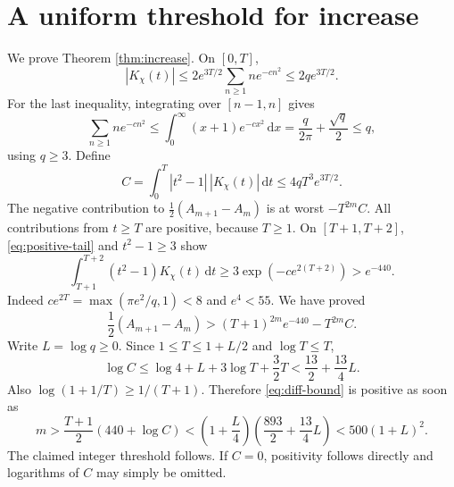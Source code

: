 \documentclass[11pt]{article}
\newcommand{\dd}{\,\mathrm d}
\begin{document}
\section{A uniform threshold for increase}
We prove Theorem \ref{thm:increase}. On $[0,T]$,
\[
 |K_\chi(t)|\le2e^{3T/2}\sum_{n\ge1}n e^{-cn^2}
 \le2qe^{3T/2}.
\]
For the last inequality, integrating over $[n-1,n]$ gives
\[
 \sum_{n\ge1}n e^{-cn^2}
 \le\int_0^\infty(x+1)e^{-cx^2}\dd x
 =\frac q{2\pi}+\frac{\sqrt q}{2}\le q,
\]
using $q\ge3$. Define
\[
 C=\int_0^T|t^2-1|\,|K_\chi(t)|\dd t
 \le4qT^3e^{3T/2}.
\]
The negative contribution to $\frac12(A_{m+1}-A_m)$ is at worst $-T^{2m}C$. All contributions from $t\ge T$ are positive, because $T\ge1$. On $[T+1,T+2]$, \eqref{eq:positive-tail} and $t^2-1\ge3$ show
\[
 \int_{T+1}^{T+2}(t^2-1)K_\chi(t)\dd t
 \ge3\exp(-ce^{2(T+2)})>e^{-440}.
\]
Indeed $ce^{2T}=\max(\pi e^2/q,1)<8$ and $e^4<55$. We have proved
\begin{equation}\label{eq:diff-bound}
 \frac12(A_{m+1}-A_m)
 >(T+1)^{2m}e^{-440}-T^{2m}C.
\end{equation}
Write $L=\log q\ge0$. Since $1\le T\le1+L/2$ and $\log T\le T$,
\[
 \log C\le\log4+L+3\log T+\frac32T
 <\frac{13}{2}+\frac{13}{4}L.
\]
Also $\log(1+1/T)\ge1/(T+1)$. Therefore \eqref{eq:diff-bound} is positive as soon as
\[
 m>\frac{T+1}{2}(440+\log C)
 <\left(1+\frac L4\right)\left(\frac{893}{2}+\frac{13}{4}L\right)
 <500(1+L)^2.
\]
The claimed integer threshold follows. If $C=0$, positivity follows directly and logarithms of $C$ may simply be omitted.
\end{document}

